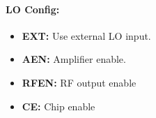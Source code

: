 \documentclass[a4paper,11pt]{article}
\newcommand{\bitrect}[2]{
  \begin{pgfonlayer}{foreground}
    \draw [thick] (0,0) rectangle (#1,1);
    \pgfmathsetmacro\result{#1-1}
    \foreach \x in {1,...,\result}
      \draw [thick] (\x,1) -- (\x, 0.8);
  \end{pgfonlayer}
  \bitlabels{#1}{#2}
}
\newcommand{\rwbits}[3]{
  \draw [thick] (#1,0) rectangle ++(#2,1) node[pos=0.5]{#3};
  \pgfmathsetmacro\start{#1+0.5}
  \pgfmathsetmacro\finish{#1+#2-0.5}
}
\newcommand{\robits}[3]{
  \begin{pgfonlayer}{background}
    \draw [thick, fill=lightgray] (#1,0) rectangle ++(#2,1) node[pos=0.5]{#3};
  \end{pgfonlayer}
  \pgfmathsetmacro\start{#1+0.5}
  \pgfmathsetmacro\finish{#1+#2-0.5}
}
\newcommand{\bitlabels}[2]{
  \foreach \bit in {1,...,#1}{
     \pgfmathsetmacro\result{#2}
     \node [above] at (\bit-0.5, 1) {\pgfmathprintnumber{\result}};
   }
}
\begin{document}
\paragraph{LO Config:}
\begin{center}
\end{center}

\begin{itemize}
\item \textbf{EXT:} Use external LO input.
\item \textbf{AEN:} Amplifier enable.
\item \textbf{RFEN:} RF output enable
\item \textbf{CE:} Chip enable
\end{itemize}
\end{document}
